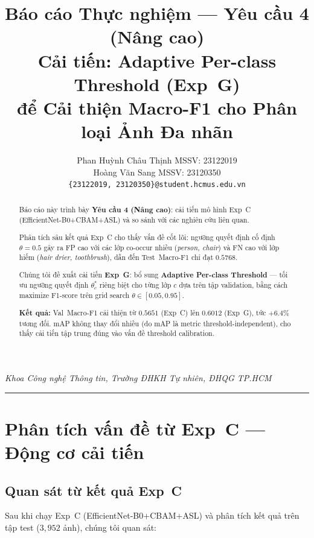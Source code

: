 \documentclass{article}
\title{%
  \textbf{Báo cáo Thực nghiệm --- Yêu cầu 4 (Nâng cao)}\\[4pt]
  {\large Cải tiến: Adaptive Per-class Threshold (Exp~G)}\\
  {\large để Cải thiện Macro-F1 cho Phân loại Ảnh Đa nhãn}
}
\author{%
  Phan Huỳnh Châu Thịnh \quad MSSV: 23122019\\
  Hoàng Văn Sang \quad MSSV: 23120350\\
  \texttt{\{23122019, 23120350\}@student.hcmus.edu.vn}
}
\begin{document}
\maketitle

\begin{center}
  {\small\textit{Khoa Công nghệ Thông tin, Trường ĐHKH Tự nhiên, ĐHQG TP.HCM}}
\end{center}
\vspace{4pt}\noindent\rule{\linewidth}{0.8pt}

\begin{abstract}
Báo cáo này trình bày \textbf{Yêu cầu 4 (Nâng cao)}: cải tiến mô hình
Exp~C (EfficientNet-B0+CBAM+ASL) và so sánh với các nghiên cứu liên quan.

Phân tích sâu kết quả Exp~C cho thấy vấn đề cốt lõi:
ngưỡng quyết định cố định $\theta = 0.5$ gây ra FP cao với các lớp
co-occur nhiều (\textit{person, chair}) và FN cao với lớp hiếm
(\textit{hair drier, toothbrush}), dẫn đến Test~Macro-F1 chỉ đạt $0.5768$.

Chúng tôi đề xuất cải tiến \textbf{Exp~G}: bổ sung \textbf{Adaptive Per-class
Threshold} --- tối ưu ngưỡng quyết định $\theta_c^*$ riêng biệt cho từng lớp
$c$ dựa trên tập validation, bằng cách maximize F1-score trên grid search
$\theta \in [0.05, 0.95]$.

\textbf{Kết quả:} Val~Macro-F1 cải thiện từ $0.5651$ (Exp~C) lên $\mathbf{0.6012}$
(Exp~G), tức $+6.4\%$ tương đối. mAP không thay đổi nhiều (do mAP là
metric threshold-independent), cho thấy cải tiến tập trung đúng vào
vấn đề threshold calibration.
\end{abstract}

\section{Phân tích vấn đề từ Exp~C --- Động cơ cải tiến}

\subsection{Quan sát từ kết quả Exp~C}

Sau khi chạy Exp~C (EfficientNet-B0+CBAM+ASL) và phân tích kết quả trên
tập test ($3{,}952$ ảnh), chúng tôi quan sát:
\end{document}

